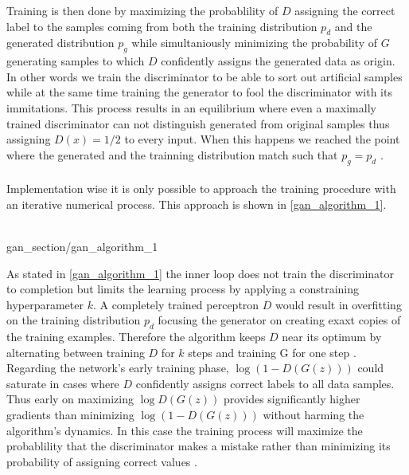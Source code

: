   Training is then done by maximizing the probablility of \( D \) assigning the correct label to the samples coming from both the training distribution \( p_d \) and the generated distribution \( p_g \) while simultaniously minimizing the probability of \( G \) generating samples to which \( D \) confidently assigns the generated data as origin.
  In other words we train the discriminator to be able to sort out artificial samples while at the same time training the generator to fool the discriminator with its immitations.
  This process results in an equilibrium where even a maximally trained discriminator can not distinguish generated from original samples thus assigning \( D(x) = 1/2 \) to every input.
  When this happens we reached the point where the generated and the trainning distribution match such that \( p_g = p_d \) \cite{1}.
  \\
  \\
  Implementation wise it is only possible to approach the training procedure with an iterative numerical process.
  This approach is shown in \cref{gan_algorithm_1}.
  \\
  \\

    \begin{algorithm}
      {gan_section/gan_algorithm_1}
      \cite[Algorithm (1)]{1}
    \end{algorithm}

  As stated in \cref{gan_algorithm_1} the inner loop does not train the discriminator to completion but limits the learning process by applying a constraining hyperparameter \( k \).
  A completely trained perceptron \( D \) would result in overfitting on the training distribution \( p_d \) focusing the generator on creating exaxt copies of the training examples.
  Therefore the algorithm keeps \( D \) near its optimum by alternating between training \( D \) for \( k \) steps and training G for one step \cite{1}.
  Regarding the network's early training phase, \( \log ( 1 - D(G(z)) ) \) could saturate in cases where \( D \) confidently assigns correct labels to all data samples.
  Thus early on maximizing \( \log D(G(z)) \) provides significantly higher gradients than minimizing \( \log( 1 - D(G(z)) ) \) without harming the algorithm's dynamics. In this case the training process will maximize the probablility that the discriminator makes a mistake rather than minimizing its probability of assigning correct values \cite{1}.

